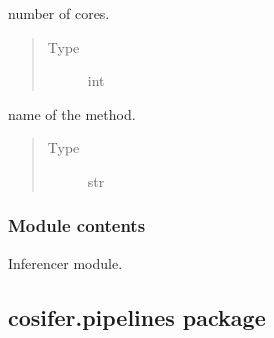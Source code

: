 \documentclass[letterpaper,10pt,english]{sphinxmanual}
\begin{document}
\begin{fulllineitems}
\begin{fulllineitems}
\end{fulllineitems}


\begin{fulllineitems}
\label{\detokenize{_modules/cosifer.inferencers:cosifer.inferencers.tigress.TIGRESS.n_cores}}
number of cores.
\begin{quote}\begin{description}
\item[{Type}] \leavevmode
int

\end{description}\end{quote}

\end{fulllineitems}


\begin{fulllineitems}
\label{\detokenize{_modules/cosifer.inferencers:cosifer.inferencers.tigress.TIGRESS.method}}
name of the method.
\begin{quote}\begin{description}
\item[{Type}] \leavevmode
str

\end{description}\end{quote}

\end{fulllineitems}


\end{fulllineitems}



\subsubsection{Module contents}
\label{\detokenize{_modules/cosifer.inferencers:module-cosifer.inferencers}}\label{\detokenize{_modules/cosifer.inferencers:module-contents}}
Inferencer module.


\subsection{cosifer.pipelines package}
\label{\detokenize{_modules/cosifer.pipelines:cosifer-pipelines-package}}\label{\detokenize{_modules/cosifer.pipelines::doc}}
\end{document}
